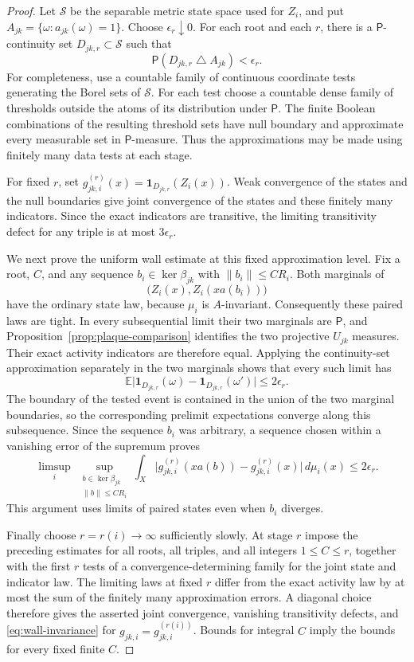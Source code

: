 \begin{proof}
Let $\mathcal S$ be the separable metric state space used for $Z_i$,
and put $A_{jk}=\{\omega:a_{jk}(\omega)=1\}$.  Choose
$\epsilon_r\downarrow0$.  For each root and each $r$, there is a
$\mathsf P$-continuity set $D_{jk,r}\subset\mathcal S$ such that
\[
              \mathsf P(D_{jk,r}\mathbin\triangle A_{jk})
                      <\epsilon_r.
\]
For completeness, use a countable family of continuous coordinate
tests generating the Borel sets of $\mathcal S$.  For each test choose
a countable dense family of thresholds outside the atoms of its
distribution under $\mathsf P$.
The finite Boolean combinations of the resulting threshold sets have
null boundary and approximate every measurable set in
$\mathsf P$-measure.  Thus the approximations may be made using
finitely many data tests at each stage.

For fixed $r$, set
$g^{(r)}_{jk,i}(x)=\mathbf 1_{D_{jk,r}}(Z_i(x))$.
Weak convergence of the states and the null boundaries give joint
convergence of the states and these finitely many indicators.  Since
the exact indicators are transitive, the limiting transitivity defect
for any triple is at most $3\epsilon_r$.

We next prove the uniform wall estimate at this fixed approximation
level.  Fix a root, $C$, and any sequence
$b_i\in\ker\beta_{jk}$ with $\|b_i\|\le CR_i$.  Both marginals of
\[
                    \bigl(Z_i(x),Z_i(xa(b_i))\bigr)
\]
have the ordinary state law, because $\mu_i$ is $A$-invariant.
Consequently these paired laws are tight.  In every subsequential
limit their two marginals are $\mathsf P$, and
Proposition~\ref{prop:plaque-comparison} identifies the two projective
$U_{jk}$ measures.  Their exact activity indicators are therefore
equal.  Applying the continuity-set approximation separately in the
two marginals shows that every such limit has
\[
 \mathbb E\bigl|
       \mathbf 1_{D_{jk,r}}(\omega)
        -\mathbf 1_{D_{jk,r}}(\omega')\bigr|
                    \le 2\epsilon_r.
\]
The boundary of the tested event is contained in the union of the two
marginal boundaries, so the corresponding prelimit expectations
converge along this subsequence.  Since the sequence $b_i$ was
arbitrary, a sequence chosen within a vanishing error of the supremum
proves
\[
 \limsup_i\ \sup_{\substack{b\in\ker\beta_{jk}\\\|b\|\le CR_i}}
 \int_X\bigl|g^{(r)}_{jk,i}(xa(b))-g^{(r)}_{jk,i}(x)\bigr|\,d\mu_i(x)
                      \le2\epsilon_r.
\]
This argument uses limits of paired states even when $b_i$ diverges.

Finally choose $r=r(i)\to\infty$ sufficiently slowly.  At stage $r$
impose the preceding estimates for all roots, all triples, and all
integers $1\le C\le r$, together with the first $r$ tests of a
convergence-determining family for the joint state and indicator law.
The limiting laws at fixed $r$ differ from the exact activity law by
at most the sum of the finitely many approximation errors.  A
diagonal choice therefore gives the asserted joint convergence,
vanishing transitivity defects, and \eqref{eq:wall-invariance} for
$g_{jk,i}=g^{(r(i))}_{jk,i}$.  Bounds for integral $C$ imply the bounds
for every fixed finite $C$.
\end{proof}

